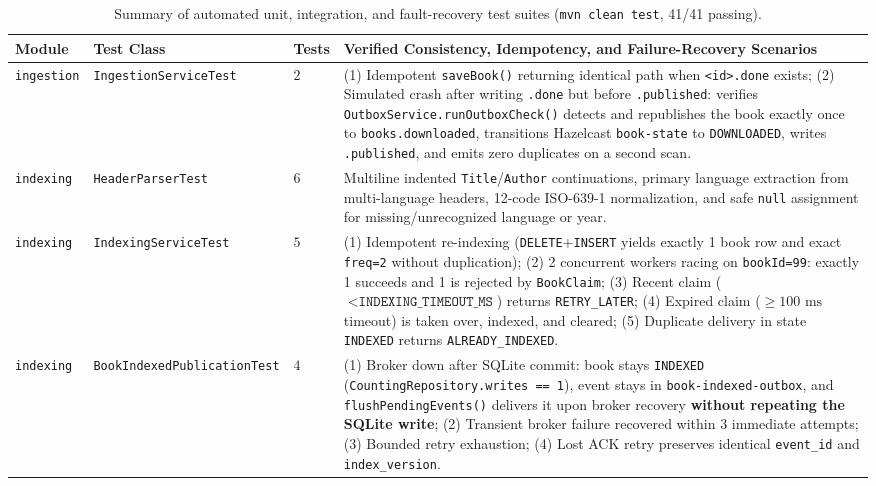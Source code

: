 \documentclass[10pt,a4paper]{article}
\begin{document}
\begin{table}[!htbp]
\centering
\caption{Summary of automated unit, integration, and fault-recovery test suites (\texttt{mvn clean test}, 41/41 passing).}
\label{tab:junit_suites}
\scriptsize
\setlength{\tabcolsep}{3.5pt}
\renewcommand{\arraystretch}{1.15}
\begin{tabularx}{\textwidth}{L{1.4cm} L{3.6cm} C{0.8cm} Y}
\toprule
\textbf{Module} & \textbf{Test Class} & \textbf{Tests} & \textbf{Verified Consistency, Idempotency, and Failure-Recovery Scenarios} \\
\midrule
\texttt{ingestion} & \texttt{IngestionServiceTest} & $2$ & (1) Idempotent \texttt{saveBook()} returning identical path when \texttt{<id>.done} exists; (2) Simulated crash after writing \texttt{.done} but before \texttt{.published}: verifies \texttt{OutboxService.runOutboxCheck()} detects and republishes the book exactly once to \texttt{books.downloaded}, transitions Hazelcast \texttt{book-state} to \texttt{DOWNLOADED}, writes \texttt{.published}, and emits zero duplicates on a second scan. \\
\texttt{indexing} & \texttt{HeaderParserTest} & $6$ & Multiline indented \texttt{Title}/\texttt{Author} continuations, primary language extraction from multi-language headers, 12-code ISO-639-1 normalization, and safe \texttt{null} assignment for missing/unrecognized language or year. \\
\texttt{indexing} & \texttt{IndexingServiceTest} & $5$ & (1) Idempotent re-indexing (\texttt{DELETE}+\texttt{INSERT} yields exactly 1 book row and exact \texttt{freq=2} without duplication); (2) 2 concurrent workers racing on \texttt{bookId=99}: exactly 1 succeeds and 1 is rejected by \texttt{BookClaim}; (3) Recent claim ($<\texttt{INDEXING\_TIMEOUT\_MS}$) returns \texttt{RETRY\_LATER}; (4) Expired claim ($\ge 100\text{ ms}$ timeout) is taken over, indexed, and cleared; (5) Duplicate delivery in state \texttt{INDEXED} returns \texttt{ALREADY\_INDEXED}. \\
\texttt{indexing} & \texttt{BookIndexedPublicationTest} & $4$ & (1) Broker down after SQLite commit: book stays \texttt{INDEXED} (\texttt{CountingRepository.writes == 1}), event stays in \texttt{book-indexed-outbox}, and \texttt{flushPendingEvents()} delivers it upon broker recovery \textbf{without repeating the SQLite write}; (2) Transient broker failure recovered within 3 immediate attempts; (3) Bounded retry exhaustion; (4) Lost ACK retry preserves identical \texttt{event\_id} and \texttt{index\_version}. \\

\end{tabularx}
\end{table}
\end{document}
